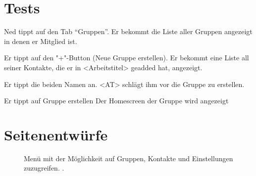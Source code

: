 \documentclass[parskip=full,11pt,twoside]{scrartcl}
\begin{document}
\section{Tests}


{Ned tippt auf den Tab  \enquote{Gruppen}.}
{Er bekommt die Liste aller Gruppen angezeigt in denen er Mitglied ist.}

%
{Er tippt auf den "+"-Button (Neue Gruppe erstellen).}%
{Er bekommt eine Liste all seiner Kontakte, die er in <Arbeitstitel> geadded hat, angezeigt.}

%
{Er tippt die beiden Namen an.}
{<AT> schlägt ihm vor die Gruppe zu erstellen.}

{Er tippt auf Gruppe erstellen}
{Der Homescreen der Gruppe wird angezeigt}

\pagebreak
\appendix

\section{Seitenentwürfe}


\begin{figure}[hb]
	\caption{\label{fig:menu}
		Menü mit der Möglichkeit auf Gruppen, Kontakte und Einstellungen zuzugreifen.
		 .
	}
\end{figure}
\end{document}
